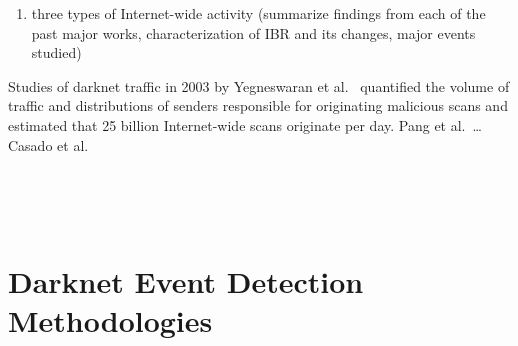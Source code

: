 \documentclass[manuscript,nonacm]{acmart}
\newcommand{\maxnote}[1]{\textit{\textcolor{violet}{#1 --Max}}}
\begin{document}
\begin{enumerate}
    \item three types of Internet-wide activity (summarize findings from each of the past major works, characterization of IBR and its changes, major events studied)
\end{enumerate}

Studies of darknet traffic in 2003 by Yegneswaran et al.~\cite{2004yegneswaran} quantified the volume of traffic and distributions of senders responsible for originating malicious scans 
and estimated that 25 billion Internet-wide scans originate per day.
Pang et al.~\cite{2004pang}\dots
Casado et al.~\cite{2005casado}

~\cite{2004yegneswaran,2004pang}

~\cite{2011dainotti,2013benson,2015benson,2012dainotti}~\cite{2021padmanabhan}


\label{sec:frameworks}
\section{Darknet Event Detection Methodologies}

\end{document}
